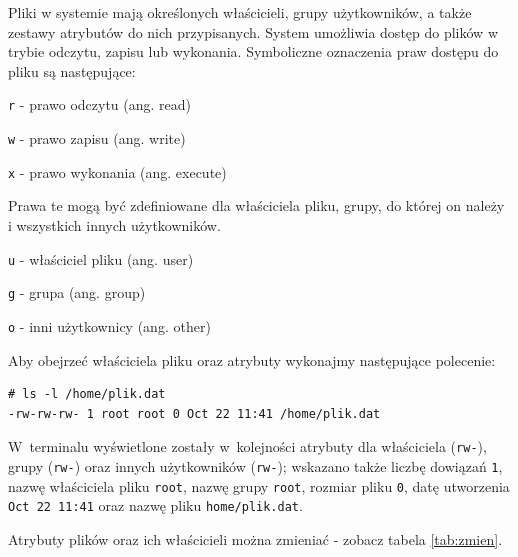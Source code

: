 \begin{example}

Pliki w systemie mają określonych właścicieli, grupy użytkowników, a także zestawy atrybutów do nich przypisanych. System umożliwia dostęp do plików w trybie odczytu, zapisu lub wykonania. Symboliczne oznaczenia praw dostępu do pliku są następujące:

\begin{myitemize}
\item \lstinline[style=MyBashStyle]{r} - prawo odczytu (ang. read)
\item \lstinline[style=MyBashStyle]{w} - prawo zapisu (ang. write)
\item \lstinline[style=MyBashStyle]{x} - prawo wykonania (ang. execute)
\end{myitemize}

Prawa te mogą być zdefiniowane dla właściciela pliku, grupy, do której on należy i wszystkich innych użytkowników.

\begin{myitemize}
\item \lstinline[style=MyBashStyle]{u} - właściciel pliku (ang. user)
\item \lstinline[style=MyBashStyle]{g} - grupa (ang. group)
\item \lstinline[style=MyBashStyle]{o} - inni użytkownicy (ang. other)
\end{myitemize}

Aby obejrzeć właściciela pliku oraz atrybuty wykonajmy następujące polecenie:

\begin{lstlisting}[style=MyBashStyle]
# ls -l /home/plik.dat
-rw-rw-rw- 1 root root 0 Oct 22 11:41 /home/plik.dat
\end{lstlisting}

W~terminalu wyświetlone zostały w~kolejności atrybuty dla właściciela (\lstinline[style=MyBashStyle]{rw-}), grupy (\lstinline[style=MyBashStyle]{rw-}) oraz innych użytkowników (\lstinline[style=MyBashStyle]{rw-}); wskazano także liczbę dowiązań \lstinline[style=MyBashStyle]{1}, nazwę właściciela pliku \lstinline[style=MyBashStyle]{root}, nazwę grupy \lstinline[style=MyBashStyle]{root}, rozmiar pliku \lstinline[style=MyBashStyle]{0}, datę utworzenia \lstinline[style=MyBashStyle]{Oct 22 11:41} oraz nazwę pliku \lstinline[style=MyBashStyle]{home/plik.dat}. 


Atrybuty plików oraz ich właścicieli można zmieniać - zobacz tabela \ref{tab:zmien}. 


\end{example}
